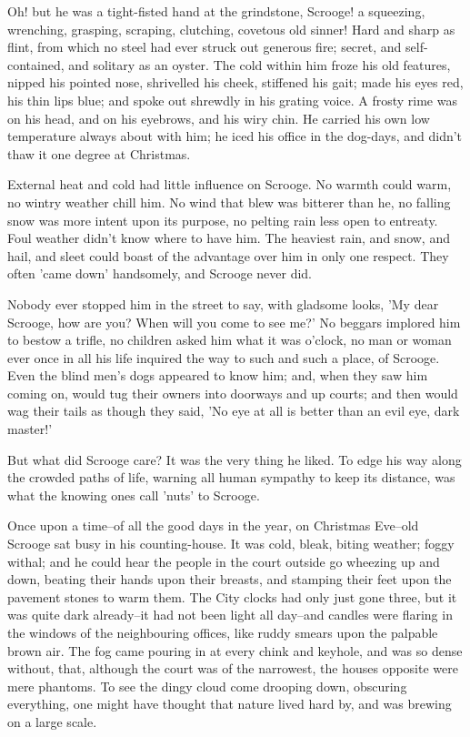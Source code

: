 Oh! but he was a tight-fisted hand at the grindstone, Scrooge! a
squeezing, wrenching, grasping, scraping, clutching, covetous old
sinner! Hard and sharp as flint, from which no steel had ever struck out
generous fire; secret, and self-contained, and solitary as an oyster.
The cold within him froze his old features, nipped his pointed nose,
shrivelled his cheek, stiffened his gait; made his eyes red, his thin
lips blue; and spoke out shrewdly in his grating voice. A frosty rime
was on his head, and on his eyebrows, and his wiry chin. He carried his
own low temperature always about with him; he iced his office in the
dog-days, and didn't thaw it one degree at Christmas.

External heat and cold had little influence on Scrooge. No warmth could
warm, no wintry weather chill him. No wind that blew was bitterer than
he, no falling snow was more intent upon its purpose, no pelting rain
less open to entreaty. Foul weather didn't know where to have him. The
heaviest rain, and snow, and hail, and sleet could boast of the
advantage over him in only one respect. They often 'came down'
handsomely, and Scrooge never did.

Nobody ever stopped him in the street to say, with gladsome looks, 'My
dear Scrooge, how are you? When will you come to see me?' No beggars
implored him to bestow a trifle, no children asked him what it was
o'clock, no man or woman ever once in all his life inquired the way to
such and such a place, of Scrooge. Even the blind men's dogs appeared to
know him; and, when they saw him coming on, would tug their owners into
doorways and up courts; and then would wag their tails as though they
said, 'No eye at all is better than an evil eye, dark master!'

But what did Scrooge care? It was the very thing he liked. To edge his
way along the crowded paths of life, warning all human sympathy to keep
its distance, was what the knowing ones call 'nuts' to Scrooge.

Once upon a time--of all the good days in the year, on Christmas
Eve--old Scrooge sat busy in his counting-house. It was cold, bleak,
biting weather; foggy withal; and he could hear the people in the court
outside go wheezing up and down, beating their hands upon their breasts,
and stamping their feet upon the pavement stones to warm them. The City
clocks had only just gone three, but it was quite dark already--it had
not been light all day--and candles were flaring in the windows of the
neighbouring offices, like ruddy smears upon the palpable brown air. The
fog came pouring in at every chink and keyhole, and was so dense
without, that, although the court was of the narrowest, the houses
opposite were mere phantoms. To see the dingy cloud come drooping down,
obscuring everything, one might have thought that nature lived hard by,
and was brewing on a large scale.

